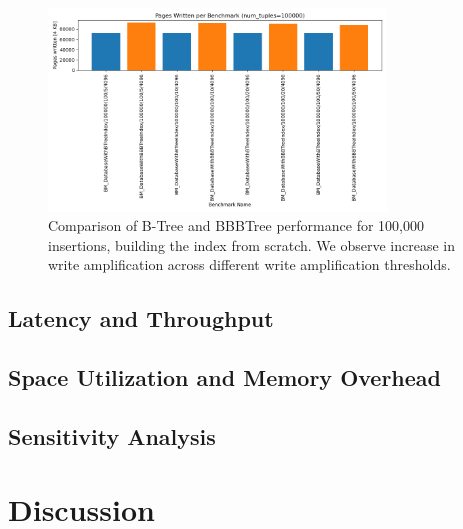 \begin{figure}[htbp]
  \centering
  \includegraphics[width=0.8\textwidth]{figures/evaluation/100K_tuples_all_wa.png}
  \caption{Comparison of B-Tree and BBBTree performance for 100,000 insertions, building the index from scratch. We observe increase in write amplification across different write amplification thresholds.}
  \label{fig:btree-vs-bbbtree-100000-all-wa}
\end{figure}


\subsection{Latency and Throughput}

\subsection{Space Utilization and Memory Overhead}
% 

\subsection{Sensitivity Analysis}

\section{Discussion}
